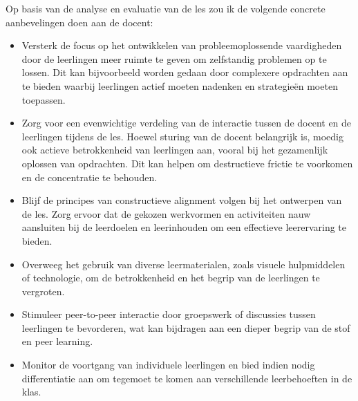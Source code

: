 \documentclass{article}
\begin{document}
                    Op basis van de analyse en evaluatie van de les zou ik de volgende concrete aanbevelingen doen aan de docent:
                    \begin{itemize}
                        \item Versterk de focus op het ontwikkelen van probleemoplossende vaardigheden door de leerlingen meer ruimte te geven om zelfstandig problemen op te lossen. Dit kan bijvoorbeeld worden gedaan door complexere opdrachten aan te bieden waarbij leerlingen actief moeten nadenken en strategieën moeten toepassen.
                        \item Zorg voor een evenwichtige verdeling van de interactie tussen de docent en de leerlingen tijdens de les. Hoewel sturing van de docent belangrijk is, moedig ook actieve betrokkenheid van leerlingen aan, vooral bij het gezamenlijk oplossen van opdrachten. Dit kan helpen om destructieve frictie te voorkomen en de concentratie te behouden.
                        \item Blijf de principes van constructieve alignment volgen bij het ontwerpen van de les. Zorg ervoor dat de gekozen werkvormen en activiteiten nauw aansluiten bij de leerdoelen en leerinhouden om een effectieve leerervaring te bieden.
                        \item Overweeg het gebruik van diverse leermaterialen, zoals visuele hulpmiddelen of technologie, om de betrokkenheid en het begrip van de leerlingen te vergroten.
                        \item Stimuleer peer-to-peer interactie door groepswerk of discussies tussen leerlingen te bevorderen, wat kan bijdragen aan een dieper begrip van de stof en peer learning.
                        \item Monitor de voortgang van individuele leerlingen en bied indien nodig differentiatie aan om tegemoet te komen aan verschillende leerbehoeften in de klas.
                    \end{itemize}
                \newpage
\end{document}
